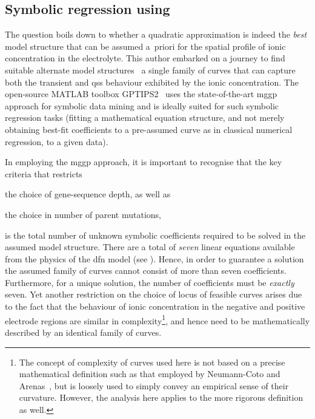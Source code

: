 \subsection{Symbolic regression using }\label{subsec:symbolicreg}

The  question boils  down to  whether a  quadratic approximation  is indeed  the
\emph{best}  model structure  that  can  be assumed  a~priori  for the  spatial
profile  of  ionic  concentration  in  the  electrolyte.  This  author  embarked
on  a journey  to  find  suitable alternate  model  structures \ie~a  single
family of  curves that can  capture both  the transient and  \gls{qss} behaviour
exhibited by  the ionic  concentration. The open-source  \textsc{MATLAB} toolbox
GPTIPS2~\cite{Searson2015}  uses the  state-of-the-art  \gls{mggp} approach  for
symbolic data  mining and is ideally  suited for such symbolic  regression tasks
(fitting a  mathematical equation structure,  and not merely  obtaining best-fit
coefficients to a  pre-assumed curve as in classical numerical  regression, to a
given data).

In employing the \gls{mggp} approach, it  is important to recognise that the key
criteria that restricts
\begin{enumerate*}[label=\emph{\alph*})]
    \item the choice of  gene-sequence depth, as well as
    \item the choice in number of parent mutations,
\end{enumerate*}
is  the   total  number  of   unknown  symbolic  coefficients  required   to  be
solved  in the  assumed  model  structure. There  are  a  total of  \emph{seven}
linear   equations  available   from  the   physics  of   the  \gls{dfn}   model
(see ). Hence, in order to
guarantee  a solution  the  assumed  family of  curves  cannot  consist of  more
than  seven coefficients.  Furthermore, for  a  unique solution,  the number  of
coefficients must be \emph{exactly} seven. Yet another restriction on the choice
of locus of feasible  curves arises due to the fact that  the behaviour of ionic
concentration  in the  negative and  positive electrode  regions are  similar in
complexity\footnote{\label{fn:complexity}The  concept  of complexity  of  curves
used  here is  not  based on  a  precise mathematical  definition  such as  that
employed by Neumann-Coto and Arenas~\cite{Neumann-Coto2017}, but is loosely used
to simply  convey an empirical sense  of their curvature. However,  the analysis
here applies  to the more  rigorous definition as well.},  and hence need  to be
mathematically described by an identical family of curves.

